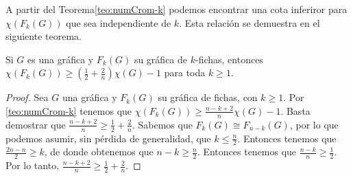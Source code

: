 A partir del Teorema\ref{teo:numCrom-k} podemos encontrar una cota inferiror
para $\chi(F_k(G))$ que sea independiente de $k$. Esta relaci\'on se demuestra
en el siguiente teorema.

\begin{teorema}
\label{teo:numCrom indep-k}
    Si $G$ es una gr\'afica y $F_k(G)$ su gr\'afica de $k$-fichas, entonces
    $\chi (F_k(G)) \geq (\frac{1}{2}+ \frac{2}{n})\chi(G) -1 $ para toda $k \geq
    1$.
\end{teorema}
    
\begin{proof}
    Sea $G$ una gr\'afica y $F_k(G)$ su gr\'afica de fichas, con $k \geq 1$. Por
    \cref{teo:numCrom-k} tenemos que $\chi(F_k(G)) \geq \frac{n-k+2}{n} \chi(G)
    -1$. Basta demostrar que $\frac{n-k+2}{n} \geq \frac{1}{2}+\frac{2}{n}$.
    Sabemos que $F_k(G) \cong F_{n-k}(G)$, por lo que podemos asumir, sin
    p\'erdida de generalidad, que $k\leq \frac{n}{2}$. Entonces tenemos que
    $\frac{2n-n}{2}\geq k$, de donde obtenemos que $n-k \geq \frac{n}{2}$.
    Entonces tenemos que $\frac{n-k}{n}\geq \frac{1}{2}$. Por lo tanto,
    $\frac{n-k+2}{n} \geq \frac{1}{2}+\frac{2}{n}$.
\end{proof}